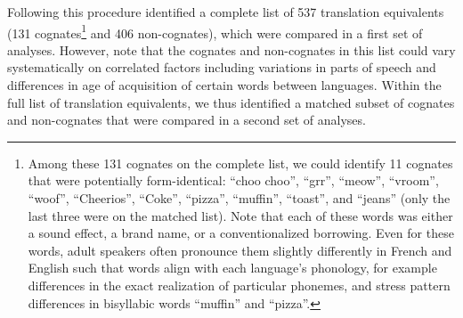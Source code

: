 \documentclass[
  ,man,floatsintext]{apa6}
\begin{document}
Following this procedure identified a complete list of 537 translation equivalents (131 cognates\footnote{Among these 131 cognates on the complete list, we could identify 11 cognates that were potentially form-identical: ``choo choo'', ``grr'', ``meow'', ``vroom'', ``woof'', ``Cheerios'', ``Coke'', ``pizza'', ``muffin'', ``toast'', and ``jeans'' (only the last three were on the matched list). Note that each of these words was either a sound effect, a brand name, or a conventionalized borrowing. Even for these words, adult speakers often pronounce them slightly differently in French and English such that words align with each language's phonology, for example differences in the exact realization of particular phonemes, and stress pattern differences in bisyllabic words ``muffin'' and ``pizza''.} and 406 non-cognates), which were compared in a first set of analyses. However, note that the cognates and non-cognates in this list could vary systematically on correlated factors including variations in parts of speech and differences in age of acquisition of certain words between languages. Within the full list of translation equivalents, we thus identified a matched subset of cognates and non-cognates that were compared in a second set of analyses.
\end{document}
